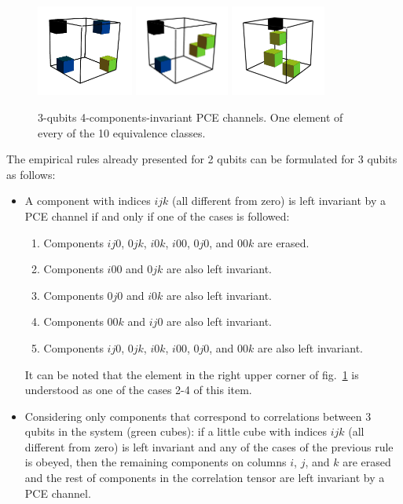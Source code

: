 \documentclass[11pt,dvipsnames]{article} %
\newcommand{\fref}[1]{fig.~\ref{#1}}
\newcommand{\1}{\mathds{1}}
\begin{document}
\begin{figure}[H]
	\hfill
	\includegraphics[height=3cm]{3q-4c-no-3}
	\hfill
	\includegraphics[height=3cm]{3q-4c-no-4}
	\hfill
	\includegraphics[height=3cm]{3q-4c-no-5}
	\hfill \hfill
	\caption{3-qubits 4-components-invariant PCE channels. 
	One element of every of the 10 equivalence classes.}
	\label{fig:QC-3q-4c}
\end{figure}
The empirical rules already presented for 2 qubits can be 
formulated for 3 qubits as follows:
\begin{itemize}
	\item A component with indices $ijk$ (all different from zero) is
	left invariant by a PCE channel if and only if 
	one of the cases is followed:
	\begin{enumerate}
		\item Components $ij0$, $0jk$, $i0k$, $i00$, $0j0$, and
		$00k$ are erased.
		\item Components $i00$ and $0jk$ are also left invariant.
		\item Components $0j0$ and $i0k$ are also left invariant.
		\item Components $00k$ and $ij0$ are also left invariant.
		\item Components $ij0$, $0jk$, $i0k$, $i00$, $0j0$, and
		$00k$ are also left invariant.
	\end{enumerate}
	It can be noted that the element in the right upper corner of 
	\fref{fig:QC-3q-4c} is understood as one of the cases 2-4 of this item.
	\item Considering only components that correspond to correlations between
	3 qubits in the system (green cubes): if a little cube 
	with indices $ijk$ (all different from zero) is left invariant 
	and any of the cases of the previous rule is obeyed, 
	then the remaining components on columns $i$, $j$, and $k$ are
	erased and the rest of components in the correlation tensor 
	are left invariant by a PCE channel. 
\end{itemize}
\end{document}
